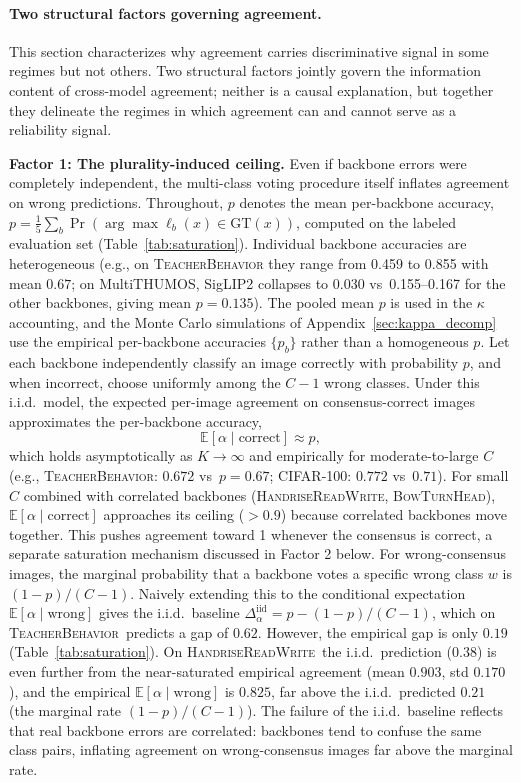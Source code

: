 \documentclass[a4paper,fleqn]{cas-sc}
\newcommand{\tb}{\textsc{TeacherBehavior}}
\newcommand{\hrw}{\textsc{HandriseReadWrite}}
\newcommand{\bth}{\textsc{BowTurnHead}}
\begin{document}
\paragraph{Two structural factors governing agreement.}
\label{sec:saturation}
This section characterizes why agreement carries discriminative signal in some regimes but not others.
Two structural factors jointly govern the information content of cross-model agreement; neither is a causal explanation, but together they delineate the regimes in which agreement can and cannot serve as a reliability signal.

\textbf{Factor 1: The plurality-induced ceiling.}
Even if backbone errors were completely independent, the multi-class voting procedure itself inflates agreement on wrong predictions.
Throughout, $p$ denotes the mean per-backbone accuracy, $p = \frac{1}{5}\sum_b \Pr(\arg\max \ell_b(x) \in \text{GT}(x))$, computed on the labeled evaluation set (Table~\ref{tab:saturation}).
Individual backbone accuracies are heterogeneous (e.g., on \tb{} they range from 0.459 to 0.855 with mean $0.67$; on MultiTHUMOS, SigLIP2 collapses to 0.030 vs~0.155--0.167 for the other backbones, giving mean $p{=}0.135$). The pooled mean $p$ is used in the $\kappa$ accounting, and the Monte Carlo simulations of Appendix~\ref{sec:kappa_decomp} use the empirical per-backbone accuracies $\{p_b\}$ rather than a homogeneous $p$.
Let each backbone independently classify an image correctly with probability $p$, and when incorrect, choose uniformly among the $C-1$ wrong classes.
Under this i.i.d.\ model, the expected per-image agreement on consensus-correct images approximates the per-backbone accuracy,
\begin{equation}
\mathbb{E}[\alpha \mid \text{correct}] \approx p,
\label{eq:alpha_correct}
\end{equation}
which holds asymptotically as $K \to \infty$ and empirically for moderate-to-large $C$ (e.g., \tb: $0.672$ vs~$p{=}0.67$; CIFAR-100: $0.772$ vs~$0.71$). For small $C$ combined with correlated backbones (\hrw, \bth), $\mathbb{E}[\alpha\mid\text{correct}]$ approaches its ceiling ($>0.9$) because correlated backbones move together. This pushes agreement toward 1 whenever the consensus is correct, a separate saturation mechanism discussed in Factor 2 below.
For wrong-consensus images, the marginal probability that a backbone votes a specific wrong class $w$ is $(1-p)/(C-1)$. Naively extending this to the conditional expectation $\mathbb{E}[\alpha \mid \text{wrong}]$ gives the i.i.d.\ baseline $\Delta_\alpha^{\text{iid}} = p - (1-p)/(C-1)$, which on \tb\ predicts a gap of $0.62$. However, the empirical gap is only $0.19$ (Table~\ref{tab:saturation}). On \hrw\ the i.i.d.\ prediction ($0.38$) is even further from the near-saturated empirical agreement (mean $0.903$, std $0.170$), and the empirical $\mathbb{E}[\alpha\mid\text{wrong}]$ is $0.825$, far above the i.i.d.\ predicted $0.21$ (the marginal rate $(1-p)/(C-1)$).
The failure of the i.i.d.\ baseline reflects that real backbone errors are correlated: backbones tend to confuse the same class pairs, inflating agreement on wrong-consensus images far above the marginal rate.
\end{document}
